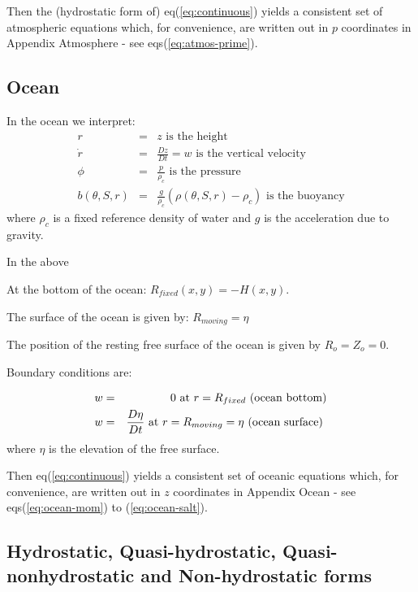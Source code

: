 \documentclass[12pt]{book}
\begin{document}
Then the (hydrostatic form of) eq(\ref{eq:continuous}) yields a consistent
set of atmospheric equations which, for convenience, are written out in $p$
coordinates in Appendix Atmosphere - see eqs(\ref{eq:atmos-prime}).

\subsection{Ocean}

In the ocean we interpret: 
\begin{eqnarray}
r &=&z\text{ is the height}  \label{eq:ocean-z} \\
\dot{r} &=&\frac{Dz}{Dt}=w\text{ is the vertical velocity}
\label{eq:ocean-w} \\
\phi &=&\frac{p}{\rho _{c}}\text{ is the pressure}  \label{eq:ocean-p} \\
b(\theta ,S,r) &=&\frac{g}{\rho _{c}}\left( \rho (\theta ,S,r)-\rho
_{c}\right) \text{ is the buoyancy}  \label{eq:ocean-b}
\end{eqnarray}
where $\rho _{c}$ is a fixed reference density of water and $g$ is the
acceleration due to gravity.\noindent

In the above

At the bottom of the ocean: $R_{fixed}(x,y)=-H(x,y)$.

The surface of the ocean is given by: $R_{moving}=\eta $

The position of the resting free surface of the ocean is given by $
R_{o}=Z_{o}=0$.

Boundary conditions are:

\begin{eqnarray}
w &=&0~\text{at }r=R_{fixed}\text{ (ocean bottom)}  \label{eq:fixed-bc-ocean}
\\
w &=&\frac{D\eta }{Dt}\text{ at }r=R_{moving}=\eta \text{ (ocean surface) 
\label{eq:moving-bc-ocean}}
\end{eqnarray}
where $\eta $ is the elevation of the free surface.

Then eq(\ref{eq:continuous}) yields a consistent set of oceanic equations
which, for convenience, are written out in $z$ coordinates in Appendix Ocean
- see eqs(\ref{eq:ocean-mom}) to (\ref{eq:ocean-salt}).

\subsection{Hydrostatic, Quasi-hydrostatic, Quasi-nonhydrostatic and
Non-hydrostatic forms}
\end{document}
